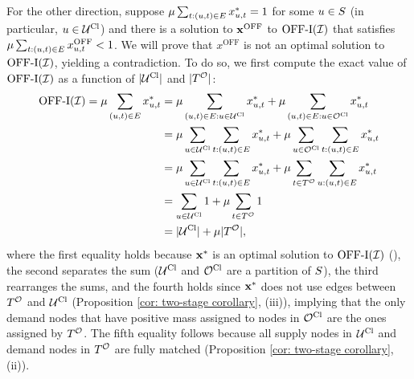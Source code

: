 {    For the other direction, suppose $\mu \sum_{t: (u,t) \in E} x^{*}_{u,t} = 1$ for some $u\in S$ (in particular, $u \in \mathcal U^{\mathrm{Cl}}$) and there is a solution to $\mathbf{x}^{\mathrm{OFF}}$ to $\mathrm{\mathrm{OFF}}\textrm{-}\mathrm{I}(\mathcal I)$ that satisfies $\mu \sum_{t: (u,t) \in E} x^{\mathrm{OFF}}_{u,t} < 1$. We will prove that $x^{\mathrm{OFF}}$ is not an optimal solution to $\mathrm{\mathrm{OFF}}\textrm{-}\mathrm{I}(\mathcal I)$, yielding a contradiction. To do so, we first compute the exact value of $\mathrm{\mathrm{OFF}}\textrm{-}\mathrm{I}(\mathcal I)$ as a function of $|\mathcal U^{\mathrm{Cl}}|$ and $|T^\mathcal O|$: %
    \begin{align*}
        \mathrm{\mathrm{OFF}}\textrm{-}\mathrm{I}(\mathcal I) = \mu \sum_{(u,t) \in E} x^*_{u,t} &= \mu \sum_{(u,t) \in E: u \in \mathcal U^{\mathrm{Cl}}} x^*_{u,t} + \mu \sum_{(u,t) \in E: u \in \mathcal O^{\mathrm{Cl}}} x^*_{u,t}\\
        &= \mu \sum_{u \in \mathcal U^{\mathrm{Cl}}} \sum_{t: (u,t) \in E} x^*_{u,t} + \mu \sum_{u \in \mathcal O^{\mathrm{Cl}}} \sum_{t: (u,t) \in E} x^*_{u,t}\\
        &= \mu \sum_{u \in \mathcal U^{\mathrm{Cl}}} \sum_{t: (u,t) \in E} x^*_{u,t} + \mu \sum_{t \in T^\mathcal O} \sum_{u: (u,t) \in E} x^*_{u,t}\\
        &= \sum_{u \in \mathcal U^{\mathrm{Cl}}} 1 + \mu \sum_{t \in T^\mathcal O} 1\\
        &= |\mathcal U^{\mathrm{Cl}}| + \mu |T^\mathcal O|,
    \end{align*}
    where the first equality holds because $\mathbf{x}^*$ is an optimal solution to  $\mathrm{\mathrm{OFF}}\textrm{-}\mathrm{I}(\mathcal I)$ (), the second separates the sum ($\mathcal U^{\mathrm{Cl}}$ and $\mathcal O^{\mathrm{Cl}}$ are a partition of $S$), the third rearranges the sums, and the fourth holds since $\mathbf{x}^*$ does not use edges between $T^{\mathcal O}$ and $\mathcal U^{\mathrm{Cl}}$ {(Proposition \ref{cor: two-stage corollary}, (iii))}, implying that the only demand nodes that have positive mass assigned to nodes in $\mathcal O^{\mathrm{Cl}}$ are the ones assigned by $T^{\mathcal O}$. The fifth equality follows because  all supply nodes in $\mathcal U^{\mathrm{Cl}}$ and demand nodes in $T^\mathcal O$ are fully matched {(Proposition \ref{cor: two-stage corollary}, (ii))}. 

}
